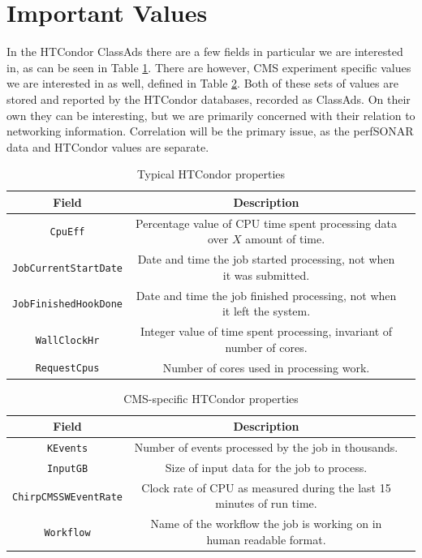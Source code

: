 \documentclass[print,ms]{nuthesis}
\begin{document}
\section{Important Values}
In the HTCondor ClassAds there are a few fields in particular we are interested in, as can be seen in Table \ref{tab:htcondor}. There are however, CMS experiment specific values we are interested in as well, defined in Table \ref{tab:cmscondor}. Both of these sets of values are stored and reported by the HTCondor databases, recorded as ClassAds. On their own they can be interesting, but we are primarily concerned with their relation to networking information. Correlation will be the primary issue, as the perfSONAR data and HTCondor values are separate.
\begin{table}
	\caption{Typical HTCondor properties}
	\label{tab:htcondor}
	\begin{tabular}{ccl}
		\toprule
		Field &Description \\
		\midrule
		\texttt{CpuEff} & \parbox{4.5cm}{Percentage value of CPU time spent processing data over $X$ amount of time.} \\
		\midrule
		\texttt{JobCurrentStartDate}& \parbox{4.5cm}{Date and time the job started processing, not when it was submitted.} \\
		\midrule
		\texttt{JobFinishedHookDone}& \parbox{4.5cm}{Date and time the job finished processing, not when it left the system.} \\
		\midrule
		\texttt{WallClockHr}& \parbox{4.5cm}{Integer value of time spent processing, invariant of number of cores.} \\
		\midrule
		\texttt{RequestCpus}& \parbox{4.5cm}{Number of cores used in processing work.} \\
		\bottomrule
	\end{tabular}
\end{table}

\begin{table}
	\caption{CMS-specific HTCondor properties}
	\label{tab:cmscondor}
	\begin{tabular}{ccl}
		\toprule
		Field &Description \\
		\midrule
		\texttt{KEvents} & \parbox{4.5cm}{Number of events processed by the job in thousands.} \\
		\midrule
		\texttt{InputGB}& \parbox{4.5cm}{Size of input data for the job to process.} \\
		\midrule
		\texttt{ChirpCMSSWEventRate}& \parbox{4.5cm}{Clock rate of CPU as measured during the last 15 minutes of run time.} \\
		\midrule
		\texttt{Workflow}& \parbox{4.5cm}{Name of the workflow the job is working on in human readable format.} \\
		\bottomrule
	\end{tabular}
\end{table}
\end{document}
